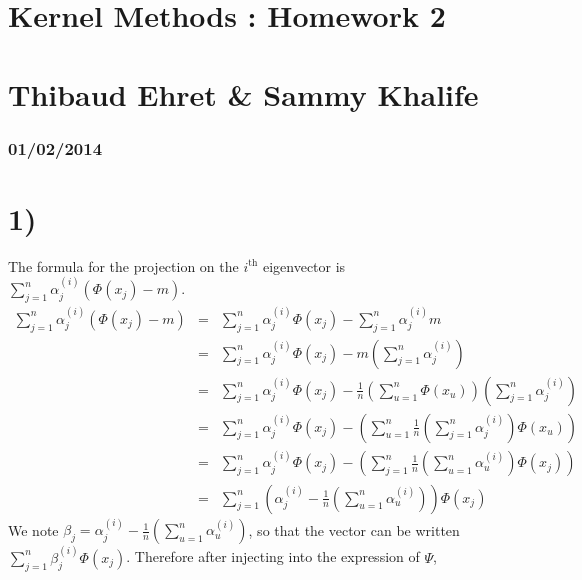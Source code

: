 
\geometry{hmargin=2.5cm,vmargin=2cm}   


\section*{Kernel Methods : Homework 2}
\section*{Thibaud Ehret \& Sammy Khalife}
\subsubsection*{01/02/2014}

\section*{1)}
The formula for the projection on the $i^\text{th}$ eigenvector is $ \sum_{j=1}^{n} \alpha^{(i)}_j (\Phi(x_j) - m) $.
\begin{eqnarray*}
	 \sum_{j=1}^{n} \alpha^{(i)}_j (\Phi(x_j) - m) &=&  \sum_{j=1}^{n} \alpha^{(i)}_j \Phi(x_j) -\sum_{j=1}^{n} \alpha^{(i)}_j m\\
	 &=& \sum_{j=1}^{n} \alpha^{(i)}_j \Phi(x_j) - m \left(\sum_{j=1}^{n} \alpha^{(i)}_j\right)\\
	 &=& \sum_{j=1}^{n} \alpha^{(i)}_j \Phi(x_j) - \frac{1}{n} \left( \sum_{u=1}^{n} \Phi(x_u) \right) \left(\sum_{j=1}^{n} \alpha^{(i)}_j\right)\\
	 &=& \sum_{j=1}^{n} \alpha^{(i)}_j \Phi(x_j) -  \left( \sum_{u=1}^{n} \frac{1}{n}\left(\sum_{j=1}^{n} \alpha^{(i)}_j\right)\Phi(x_u) \right)\\ 
	 &=& \sum_{j=1}^{n} \alpha^{(i)}_j \Phi(x_j) -  \left( \sum_{j=1}^{n} \frac{1}{n}\left(\sum_{u=1}^{n} \alpha^{(i)}_u\right)\Phi(x_j) \right)\\ 
	 &=& \sum_{j=1}^{n} \left(\alpha^{(i)}_j - \frac{1}{n}\left(\sum_{u=1}^{n} \alpha^{(i)}_u\right)\right)\Phi(x_j)
\end{eqnarray*}
We note $\beta_j = \alpha^{(i)}_j - \frac{1}{n}\left(\sum_{u=1}^{n} \alpha^{(i)}_u\right)$, so that the vector can be written $ \sum_{j=1}^{n} \beta^{(i)}_j \Phi(x_j)$. 
Therefore after injecting into the expression of $\Psi$,
